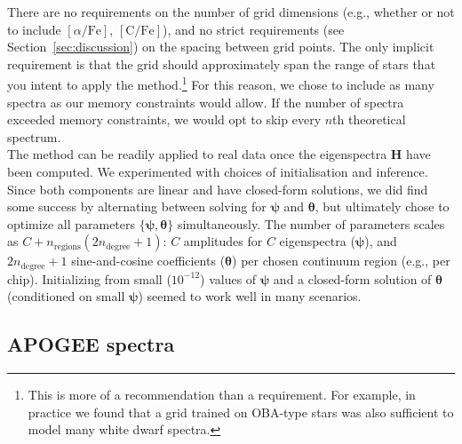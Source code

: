\documentclass[modern]{aastex631}
\newcommand{\vectheta}{\boldsymbol{\theta}}
\newcommand{\vecpsi}{\boldsymbol{\psi}}
\newcommand{\vecW}{\mathbf{W}}
\newcommand{\vecH}{\mathbf{H}}
\begin{document}
There are no requirements on the number of grid dimensions (e.g., whether or not to include $[\alpha/\mathrm{Fe}]$, $[\mathrm{C/Fe}]$), and no strict requirements (see Section~\ref{sec:discussion}) on the spacing between grid points. The only implicit requirement is that the grid should approximately span the range of stars that you intent to apply the method.\footnote{This is more of a recommendation than a requirement. For example, in practice we found that a grid trained on OBA-type stars was also sufficient to model many white dwarf spectra.} For this reason, we chose to include as many spectra as our memory constraints would allow. If the number of spectra exceeded memory constraints, we would opt to skip every $n$th theoretical spectrum.\\






The method can be readily applied to real data once the eigenspectra $\vecH$ have been computed. We experimented with choices of initialisation and inference. Since both components are linear and have closed-form solutions, we did find some success by alternating between solving for $\vecpsi$ and $\vectheta$, but ultimately chose to optimize all parameters $\{\vecpsi,\vectheta\}$ simultaneously. The number of parameters scales as $C + n_\textrm{regions}(2n_\textrm{degree} + 1)$: $C$ amplitudes for $C$ eigenspectra ($\vecpsi$), and $2n_\textrm{degree} + 1$ sine-and-cosine coefficients ($\vectheta$) per chosen continuum region (e.g., per chip). Initializing from small ($10^{-12}$) values of $\vecpsi$ and a closed-form solution of $\vectheta$ (conditioned on small $\vecpsi$) seemed to work well in many scenarios. \\

\subsection{APOGEE spectra}
\label{sec:apogee}
\end{document}
